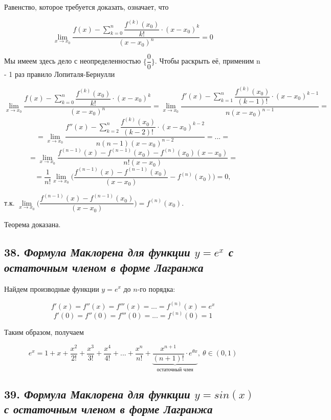 Равенство, которое требуется доказать, означает, что

$$
\lim\limits_{x \rightarrow x_0}{\dfrac{f(x) -\sum\limits_{k=0}^n{\dfrac{f^{(k)}(x_0)}{k!}}\cdot (x - x_0)^k}{(x - x_0)^n}} = 0
$$

Мы имеем здесь дело с неопределенностью ${\{\dfrac{0}{0}\}}$. Чтобы раскрыть её, применим n - 1 раз правило Лопиталя-Бернулли

$$
\lim\limits_{x \rightarrow x_0}{\dfrac{f(x) -\sum\limits_{k=0}^n{\dfrac{f^{(k)}(x_0)}{k!}}\cdot (x - x_0)^k}{(x - x_0)^n}} 
= \lim\limits_{x \rightarrow x_0}\dfrac{f'(x) -\sum\limits_{k=1}^n{\dfrac{f^{(k)}(x_0)}{(k-1)!}}\cdot (x - x_0)^{k-1}}{n(x - x_0)^{n-1}} 
=
$$ $$
= \lim\limits_{x \rightarrow x_0}{\dfrac{f''(x) -\sum\limits_{k=2}^n{\dfrac{f^{(k)}(x_0)}{(k-2)!}}\cdot (x - x_0)^{k-2}}{n(n-1)(x - x_0)^{n-2}}} 
= ...=
$$ $$
=\lim\limits_{x \rightarrow x_0}{\dfrac{f^{(n-1)}(x)-f^{(n-1)}(x_0) - f^{(n)}(x_0)(x - x_0)}{n!(x - x_0)}} 
=
$$ $$
= \dfrac{1}{n!}\lim\limits_{x \rightarrow x_0}\bigg({\dfrac{f^{(n-1)}(x)-f^{(n-1)}(x_0)}{(x - x_0)}}- f^{(n)}(x_0)\bigg)=0,
$$

т.к. $\lim\limits_{x \rightarrow x_0}\bigg({\dfrac{f^{(n-1)}(x)-f^{(n-1)}(x_0)}{(x - x_0)}}\bigg)=f^{(n)}(x_0)$.

Теорема доказана.
\newpage 
\subsection*{38. \textit{Формула Маклорена для функции $y = e^x$ с остаточным членом в форме Лагранжа}}

Найдем производные функции $y = e^x$ до $n$-го порядка:

$$f'(x) = f''(x) = f'''(x) =...=f^{(n)}(x) = e^x$$ $$f'(0) = f''(0) = f'''(0) =...=f^{(n)}(0) = 1$$

Таким образом, получаем
\begin{mainQuote}

$$ e^x = 1 + x + \dfrac{x^2}{2!}+ \dfrac{x^3}{3!}+ \dfrac{x^4}{4!} + ... + \dfrac{x^n}{n!} + \underbrace{\dfrac{x^{n + 1}}{(n+1)!}\cdot e^{\theta x}}_{\text{остаточный\ член}}, \ \theta \in (0, 1) $$
\end{mainQuote}
\newpage 
\subsection*{39. \textit{Формула Маклорена для функции $y = sin(x)$ с остаточным членом в форме Лагранжа}}

